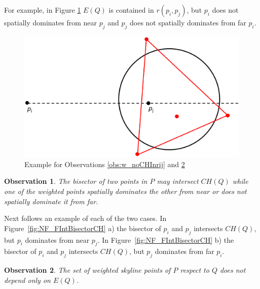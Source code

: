 \documentclass[11pt,onecolumn]{elsart3p}
\newtheorem{observation}{Observation}
\begin{document}
         For example, in Figure \ref{fig:NFOnlyE} $E(Q)$ is contained in $r(p_i, p_j)$, but $p_i$ does not spatially dominates from near $p_j$ and $p_j$ does not spatially dominates from far $p_i$.

        \begin{figure}[h]
           \begin{center}
              \includegraphics[width=0.4\linewidth]{img/NFOnlyE.eps}
              \caption{Example for Observations \ref{obs:w_noCHInrij} and \ref{obs:w_notCH}}

              \label{fig:NFOnlyE}
            \end{center}
        \end{figure}


        \vspace{1em}
        \begin{observation} The bisector of two points in $P$ may intersect $CH(Q)$ while one of the weighted points spatially dominates the other from near or does not spatially dominate it from far. \label{observation:w_notBisectorCH}
        \end{observation}

        Next follows an example of each of the two cases. In Figure~\ref{fig:NF_FIntBisectorCH} a) the bisector of $p_i$ and $p_j$ intersects $CH(Q)$, but $p_i$ dominates from near $p_j$. In Figure~\ref{fig:NF_FIntBisectorCH} b) the bisector of $p_i$ and $p_j$ intersects $CH(Q)$, but $p_j$ dominates from far $p_i$.


        \vspace{1em}
        \begin{observation} The set of weighted skyline points of $P$ respect to $Q$ does not depend only on $E(Q)$.
           \label{obs:w_notCH}
        \end{observation}
\end{document}
